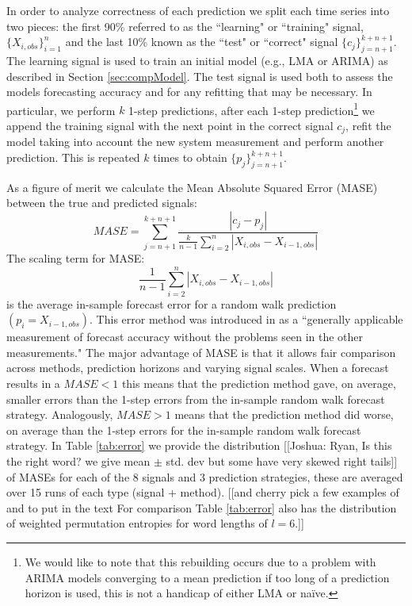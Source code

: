 In order to analyze correctness of each prediction we split each time series into two pieces: the first 90\% referred to as the ``learning" or ``training" signal, $\{X_{i,obs}\}_{i=1}^{n}$ and the last 10\% known as the ``test" or ``correct" signal $\{c_j\}_{j=n+1}^{k+n+1}$. The learning signal is used to train an initial model (e.g., LMA or ARIMA) as described in Section \ref{sec:compModel}. The test signal is used both to assess the models forecasting accuracy and for any refitting that may be necessary. In particular, we perform $k$ 1-step predictions, after each 1-step prediction\footnote{We would like to note that this rebuilding occurs due to a problem with ARIMA models converging to a mean prediction if too long of a prediction horizon is used, this is not a handicap of either LMA or na\"ive.} we append the training signal with the next point in the correct signal $c_j$, refit the model taking into account the new system measurement and perform another prediction. This is repeated $k$ times to obtain $\{p_j\}_{j=n+1}^{k+n+1}$.

As a figure of merit we calculate the Mean Absolute Squared Error (MASE)\cite{MASE} between the true and predicted signals: 
$$MASE = \sum_{j=n+1}^{k+n+1}\frac{|c_j-p_j| }{\frac{k}{n-1}\sum^n_{i=2}|X_{i,obs}-X_{i-1,obs}|}$$
The scaling term for MASE:
$$\frac{1}{n-1}\sum^n_{i=2}|X_{i,obs}-X_{i-1,obs}|$$ 
is the average in-sample forecast error for a random walk prediction $(p_i=X_{i-1,obs})$. This error method was introduced in \cite{MASE} as a ``generally applicable measurement of forecast accuracy without the problems seen in the other measurements." The major advantage of MASE is that it allows fair comparison across methods, prediction horizons and varying signal scales. When a forecast results in a $MASE<1$ this means that the prediction method gave, on average, smaller errors than the 1-step errors from the in-sample random walk forecast strategy. Analogously, $MASE>1$ means that the prediction method did worse, on average than the 1-step errors for the in-sample random walk forecast strategy. In Table \ref{tab:error} we provide the distribution [[Joshua: Ryan, Is this the right word? we give mean $\pm$ std. dev but some have very skewed right tails]]  of MASEs for each of the 8 signals and 3 prediction strategies, these are averaged over 15 runs of each type (signal + method). [[and cherry pick a few examples of \gcc and \col to put in the text For comparison Table \ref{tab:error} also has the distribution of weighted permutation entropies for word lengths of $l=6$.]]








